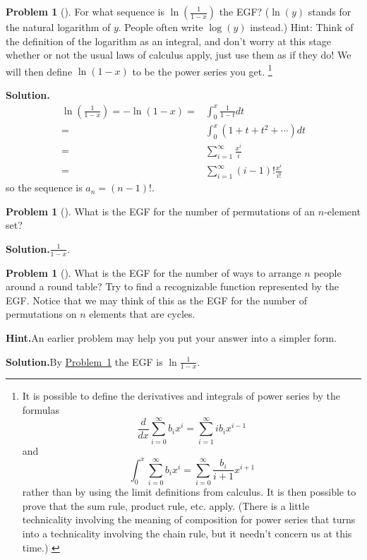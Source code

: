 \documentclass[10pt,]{book}
\theoremstyle{plain}
\theoremstyle{definition}
\newtheorem{activity}[project]{Problem}
\theoremstyle{definition}
\numberwithin{equation}{chapter}
\newcommand{\amp}{&}
\begin{document}
\begin{activity}[]\label{ln1over1-x}
For what sequence is \(\ln(\frac{1}{1-x})\) the EGF? (\(\ln (y)\) stands for the natural logarithm of \(y\). People often write \(\log(y)\) instead.) Hint: Think of the definition of the logarithm as an integral, and don't worry at this stage whether or not the usual laws of calculus apply, just use them as if they do! We will then define \(\ln({ 1-x})\) to be the power series you get. \footnote{  It is possible to define the derivatives and integrals of power series by the formulas%
\begin{equation*}
\frac{d}{dx}
\sum_{i=0}^\infty b_ix^i = \sum_{i=1}^\infty ib_ix^{i-1}
\end{equation*}
and%
\begin{equation*}
\int_0^x
\sum_{i=0}^\infty b_ix^i = \sum_{i=0}^\infty \frac{b_i}{i+1}x^{i+1}
\end{equation*}
rather than by using the limit definitions from calculus.  It is then possible to prove that the sum rule, product rule, etc. apply.  (There is a little technicality involving the meaning of composition for power series that turns into a technicality involving the chain rule, but it needn't concern us at this time.) \label{fn-26}}%
\par\medskip\noindent%
\textbf{Solution.}\quad %
\begin{align*}
\ln(\frac{1}{1-x}) =-\ln(1-x)  =\amp
\int_0^x \frac{1}{1-t}dt\\
=\amp \int_0^x (1+t+t^2+\cdots)dt\\
=\amp \sum_{i=1}^\infty \frac{x^i}{i}\\
=\amp  \sum_{i=1}^\infty (i-1)!\frac{x^i}{i!}
\end{align*}
so the sequence is \(a_n = (n-1)!\).%
\end{activity}
\begin{activity}[]\label{exponentialpermutations}
What is the EGF for the number of permutations of an \(n\)-element set?%
\par\medskip\noindent%
\textbf{Solution.}\quad \(\frac{1}{1-x}\).%
\end{activity}
\begin{activity}[]\label{exponentialroundtable}
What is the EGF for the number of ways to arrange \(n\) people around a round table? Try to find a recognizable function represented by the EGF. Notice that we may think of this as the EGF for the number of permutations on \(n\) elements that are cycles.%
\par\medskip\noindent%
\textbf{Hint.}\quad An earlier problem may help you put your answer into a simpler form.%
\par\medskip\noindent%
\textbf{Solution.}\quad By \hyperref[ln1over1-x]{Problem~\ref{ln1over1-x}} the EGF is \(\ln\frac{1}{1-x}\).%
\end{activity}
\end{document}
